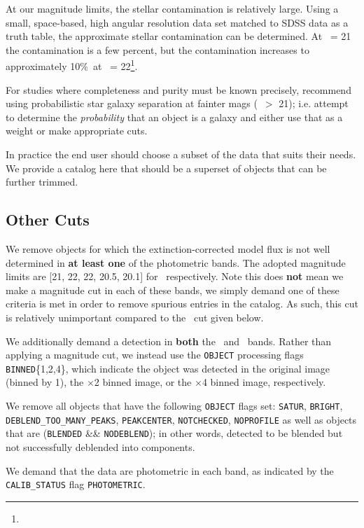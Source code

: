 \documentclass[preprint]{aastex}
\newcommand{\contamworst}{10\%}
\begin{document}
At our magnitude limits, the stellar contamination is relatively large.  Using
a small, space-based, high angular resolution data set matched to SDSS data as
a truth table, the approximate stellar contamination can be determined.  At
\rmag\ = 21 the contamination is a few percent, but the contamination increases
to approximately \contamworst\ at \rmag\ = 22\footnote{\DRsevsg}.  

For studies where completeness and purity must be known precisely,
\citet{ScrantonMag05} recommend using probabilistic star galaxy separation at
fainter mags (\rmag\ $ > $ 21); i.e.  attempt to determine the {\it
probability} that an object is a galaxy and either use that as a weight or make
appropriate cuts. 


In practice the end user should choose a subset of the data that suits their
needs.  We provide a catalog here that should be a superset of objects that can
be further trimmed.

\subsection{Other Cuts}

We remove objects for which the extinction-corrected \citep{Schlegel98} model
flux is not well determined in {\bf at least one} of the photometric bands.  The
adopted magnitude limits are [21, 22, 22, 20.5, 20.1] for \allmag\
respectively. Note this does {\bf not} mean we make a magnitude cut in each
of these bands, we simply demand one of these criteria is met in order
to remove spurious entries in the catalog.  As such, this cut is relatively
unimportant compared to the \rmag\ cut given below.

We additionally demand a detection in {\bf both} the \rmag\ and \imag\ bands.
Rather than applying a magnitude cut, we instead use the \texttt{OBJECT}
processing flags \texttt{BINNED}\{1,2,4\}, which indicate the object was
detected in the original image (binned by 1), the $\times$2 binned image, or
the $\times$4 binned image, respectively\citep{Stough02}.

We remove all objects that have the following \texttt{OBJECT} flags set:
\texttt{SATUR}, \texttt{BRIGHT}, \texttt{DEBLEND\_TOO\_MANY\_PEAKS},
\texttt{PEAKCENTER}, \texttt{NOTCHECKED}, \texttt{NOPROFILE} as well as objects
that are (\texttt{BLENDED} \&\& \texttt{NODEBLEND}); in other words, detected
to be blended but not successfully deblended into components. 

We demand that the data are photometric in each band, as indicated by
the \texttt{CALIB\_STATUS} flag \texttt{PHOTOMETRIC}.
\end{document}
